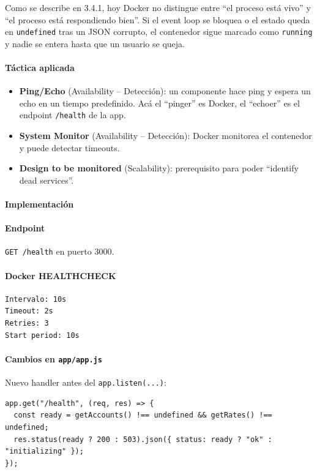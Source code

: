 Como se describe en 3.4.1, hoy Docker no distingue entre ``el proceso está vivo'' y ``el proceso está respondiendo bien''. Si el event loop se bloquea o el estado queda en \texttt{undefined} tras un JSON corrupto, el contenedor sigue marcado como \texttt{running} y nadie se entera hasta que un usuario se queja.

\paragraph{Táctica aplicada}

\begin{itemize}[leftmargin=*]
    \item \textbf{Ping/Echo} (Availability -- Detección): un componente hace ping y espera un echo en un tiempo predefinido. Acá el ``pinger'' es Docker, el ``echoer'' es el endpoint \texttt{/health} de la app.
    \item \textbf{System Monitor} (Availability -- Detección): Docker monitorea el contenedor y puede detectar timeouts.
    \item \textbf{Design to be monitored} (Scalability): prerequisito para poder ``identify dead services''.
\end{itemize}

\paragraph{Implementación}

\paragraph{Endpoint} \texttt{GET /health} en puerto 3000.

\paragraph{Docker HEALTHCHECK}
\begin{verbatim}
Intervalo: 10s
Timeout: 2s
Retries: 3
Start period: 10s
\end{verbatim}

\paragraph{Cambios en \texttt{app/app.js}} Nuevo handler antes del \texttt{app.listen(...)}:

\begin{verbatim}
app.get("/health", (req, res) => {
  const ready = getAccounts() !== undefined && getRates() !== undefined;
  res.status(ready ? 200 : 503).json({ status: ready ? "ok" : "initializing" });
});
\end{verbatim}


